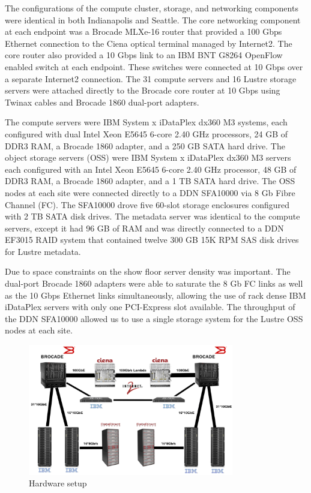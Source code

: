 \documentclass[]{sig-alternate}
\begin{document}
The configurations of the compute cluster, storage, and networking components were identical in both Indianapolis and
Seattle. The core networking component at each endpoint was a Brocade MLXe-16 router that provided a 100 Gbps
Ethernet connection to the Ciena optical terminal managed by Internet2. The core router also provided a 10
Gbps link to an IBM BNT G8264 OpenFlow enabled switch at each endpoint. These switches were connected at 10 Gbps
over a separate Internet2 connection. The 31 compute servers and 16 Lustre storage
servers were attached directly to the Brocade core router at 10 Gbps using Twinax cables and Brocade 1860
dual-port adapters.

The compute servers were IBM System x iDataPlex dx360 M3 systems, each configured with dual Intel Xeon E5645
6-core 2.40 GHz processors, 24 GB of DDR3 RAM, a Brocade 1860 adapter, and a 250 GB SATA hard drive. The
object storage servers (OSS) were IBM System x iDataPlex dx360 M3 servers each configured with an Intel Xeon
E5645 6-core 2.40 GHz processor, 48 GB of DDR3 RAM, a Brocade 1860 adapter, and a 1 TB SATA hard drive. The
OSS nodes at each site were connected directly to a DDN SFA10000 via 8 Gb Fibre Channel (FC). The SFA10000
drove five 60-slot storage enclosures configured with 2 TB SATA disk drives. The metadata server was identical
to the compute servers, except it had 96 GB of RAM and was directly connected to a DDN EF3015 RAID system that
contained twelve 300 GB 15K RPM SAS disk drives for Lustre metadata.

Due to space constraints on the show floor server density was important. The dual-port Brocade 1860 adapters
were able to saturate the 8 Gb FC links as well as the 10 Gbps Ethernet links simultaneously, allowing the use
of rack dense IBM iDataPlex servers with only one PCI-Express slot available. The throughput of the DDN
SFA10000 allowed us to use a single storage system for the Lustre OSS nodes at each site.

\begin{figure}
\begin{center}
\includegraphics[width=0.80\textwidth]{figures/Figure1.png}
\caption{Hardware setup}
\label{fig:hardwaresetup}
\end{center}
\end{figure}
\end{document}
